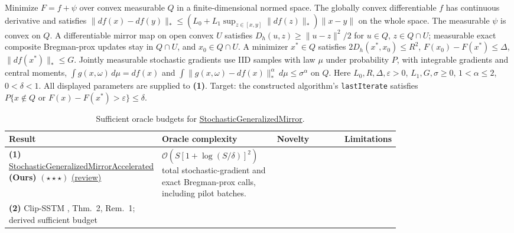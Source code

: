\begin{table}[tp]
\centering
\caption{Sufficient oracle budgets for \href{https://github.com/k3nfalt/longtails/blob/main/LongTails/Setups/StochasticGeneralizedMirror.lean}{StochasticGeneralizedMirror}.}\label{tab:StochasticGeneralizedMirror}
\parbox{\linewidth}{\footnotesize Minimize $F=f+\psi$ over convex measurable $Q$ in a finite-dimensional normed space. The globally convex differentiable $f$ has continuous derivative and satisfies $\|df(x)-df(y)\|_*\le (L_0+L_1\sup_{z\in[x,y]}\|df(z)\|_*)\|x-y\|$ on the whole space. The measurable $\psi$ is convex on $Q$. A differentiable mirror map on open convex $U$ satisfies $D_h(u,z)\ge\|u-z\|^2/2$ for $u\in Q$, $z\in Q\cap U$; measurable exact composite Bregman-prox updates stay in $Q\cap U$, and $x_0\in Q\cap U$. A minimizer $x^*\in Q$ satisfies $2D_h(x^*,x_0)\le R^2$, $F(x_0)-F(x^*)\le\Delta$, $\|df(x^*)\|_*\le G$. Jointly measurable stochastic gradients use IID samples with law $\mu$ under probability $P$, with integrable gradients and central moments, $\int g(x,\omega)\,d\mu=df(x)$ and $\int\|g(x,\omega)-df(x)\|_*^\alpha\,d\mu\le\sigma^\alpha$ on $Q$. Here $L_0,R,\Delta,\varepsilon>0$, $L_1,G,\sigma\ge0$, $1<\alpha\le2$, $0<\delta<1$. All displayed parameters are supplied to \textbf{(1)}. Target: the constructed algorithm's \texttt{lastIterate} satisfies $P\{x\notin Q\text{ or }F(x)-F(x^*)>\varepsilon\}\le\delta$.}\par\smallskip
\begin{threeparttable}
\footnotesize
\setlength{\tabcolsep}{4pt}\renewcommand{\arraystretch}{1.25}
\begin{tabularx}{\linewidth}{@{}>{\raggedright\arraybackslash}p{0.20\linewidth}>{\raggedright\arraybackslash}p{0.325\linewidth}>{\raggedright\arraybackslash}p{0.245\linewidth}>{\raggedright\arraybackslash}X@{}}
\toprule
\textbf{Result} & \textbf{Oracle complexity} & \textbf{Novelty} & \textbf{Limitations} \\
\midrule
\textbf{(1)} \href{https://github.com/k3nfalt/longtails/blob/main/LongTails/Theorems/StochasticGeneralizedMirrorAccelerated.lean}{Stochastic\allowbreak Generalized\allowbreak Mirror\allowbreak Accelerated} \textbf{(Ours)} $(\star\star\star)$ \href{https://github.com/k3nfalt/longtails/blob/main/scripts/reviews/StochasticGeneralizedMirrorAccelerated.md}{(review)}
& $\mathcal{O}\!\left(S[1+\log(S/\delta)]^2\right)$ total stochastic-gradient and exact Bregman-prox calls, including pilot batches.
& & \\
\midrule[1.2pt]
\textbf{(2)} Clip-SSTM \citep{fvRadiusElKadi2026v2}, Thm.~2, Rem.~1; derived sufficient budget

\end{tabularx}
\end{threeparttable}
\end{table}
